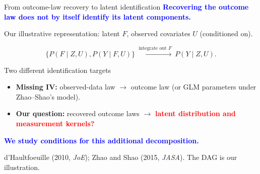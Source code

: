 \documentclass[aspectratio=169,10pt]{beamer}
\newcommand{\slideannotation}{\fontsize{8pt}{9.6pt}\selectfont}
\newcommand{\bluekey}[1]{\textcolor{Blue}{\textbf{#1}}}
\newcommand{\redkey}[1]{\textcolor{Red}{\textbf{#1}}}
\begin{document}
\begin{frame}{From outcome-law recovery to latent identification}
\bluekey{Recovering the outcome law does not by itself identify its latent components.}
\par\smallskip
Our illustrative representation: latent $F$, observed covariates $U$ (conditioned on).
\par\smallskip
{\centering
{}
\par}
\[
\bigl\{P(F\mid Z,U),P(Y\mid F,U)\bigr\}
\ \xrightarrow{\text{integrate out }F}\ P(Y\mid Z,U).
\]
\begin{block}{Two different identification targets}
\begin{itemize}
\item \textbf{Missing IV:} observed-data law $\longrightarrow$ outcome law
(or GLM parameters under Zhao--Shao's model).
\item \textbf{Our question:} recovered outcome laws $\longrightarrow$
\redkey{latent distribution and measurement kernels?}
\end{itemize}
\end{block}
\bluekey{We study conditions for this additional decomposition.}
\par\smallskip
{\slideannotation d'Haultfoeuille (2010, \emph{JoE}); Zhao and Shao (2015, \emph{JASA}). The DAG is our illustration.}
\end{frame}
\end{document}
